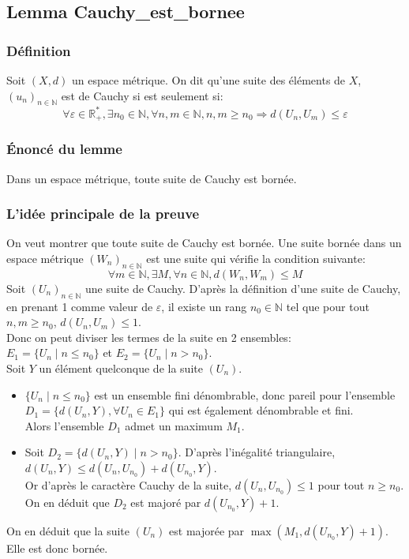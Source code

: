 \subsection{Lemma Cauchy\_est\_bornee}
\subsubsection{Définition}
Soit $(X,d)$ un espace métrique. On dit qu'une suite des éléments de $X$, $(u_n)_{n\in \mathbb{N}}$ est de Cauchy si est seulement si: $$\forall \varepsilon \in \mathbb{R_+^*}, \exists n_0 \in \mathbb{N}, \forall n,m \in \mathbb{N}, n,m \geq n_0 \Rightarrow d(U_n,U_m) \leq \varepsilon$$ 
\subsubsection{\'Enoncé du lemme}
Dans un espace métrique, toute suite de Cauchy est bornée.

\subsubsection{L'idée principale de la preuve}
On veut montrer que toute suite de Cauchy est bornée. Une suite bornée dans un espace métrique $(W_n)_{n\in\mathbb{N}}$ est une suite qui vérifie la condition suivante:$$ \forall m \in \mathbb{N}, \exists M , \forall n \in \mathbb{N}, d(W_n,W_m)\leq M $$
Soit $(U_n)_{n\in\mathbb{N}}$ une suite de Cauchy.
D'après la définition d'une suite de Cauchy, en prenant 1 comme valeur de $\varepsilon$, il existe un rang $n_0 \in \mathbb{N}$ tel que pour tout $n,m \geq n_0$, $d(U_n,U_m)\leq 1$.\\ Donc on peut diviser les termes de la suite en 2 ensembles: \\ $E_1=\big\{U_n\mid n\leq n_0 \big\}$ et $E_2=\big\{U_n\mid n > n_0 \big\}$. \\
Soit $Y$ un élément quelconque de la suite $(U_n)$.
\begin{itemize}
    \item $\big\{U_n\mid n\leq n_0 \big\}$ est un ensemble fini dénombrable, donc pareil pour l'ensemble $D_1=\big\{d(U_n,Y), \forall U_n\in E_1\big\}$ qui est également dénombrable et fini.\\ Alors l'ensemble $D_1$ admet un maximum $M_1$.
    \item Soit $D_2=\big\{d(U_n,Y)\mid n> n_0 \big\}$. D'après l'inégalité triangulaire, $d(U_n,Y)\leq d(U_n,U_{n_0})+d(U_{n_0},Y)$.\\ Or d'après le caractère Cauchy de la suite, $d(U_n,U_{n_0})\leq 1$ pour tout $n\geq n_0$.\\ On en déduit que $D_2$ est majoré par $d(U_{n_0},Y)+1$. 
\end{itemize}
On en déduit que la suite $(U_n)$ est majorée par $\max(M_1,d(U_{n_0},Y)+1)$. Elle est donc bornée.\\


